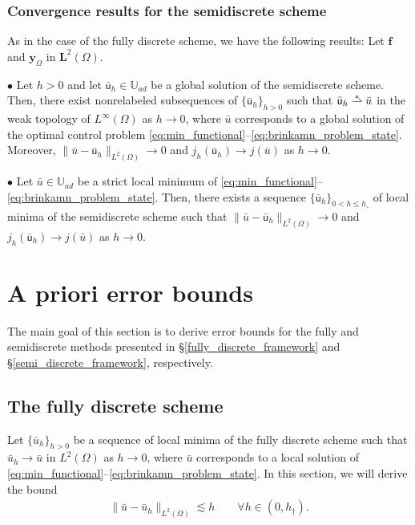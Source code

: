 \documentclass[final]{siamart0216}
\begin{document}
\subsubsection{Convergence results for the semidiscrete scheme}

As in the case of the fully discrete scheme, we have the following results: Let $\mathbf{f}$ and $\mathbf{y}_{\Omega}$ in $\mathbf{L}^2(\Omega)$.

$\bullet$ Let $h>0$ and let $\bar{\mathsf{u}}_{h}\in \mathbb{U}_{ad}$ be a global solution of the semidiscrete scheme. Then, there exist nonrelabeled subsequences of $\{\bar{\mathsf{u}}_{h}\}_{h>0}$ such that $\bar{\mathsf{u}}_{h} \mathrel{\ensurestackMath{\stackon[1pt]{\rightharpoonup}{\scriptstyle\ast}}} \bar{u}$ in the weak topology of $L^{\infty}(\Omega)$ as $h \rightarrow 0$, where $\bar{u}$ corresponds to a global solution of the optimal control problem \eqref{eq:min_functional}--\eqref{eq:brinkamn_problem_state}. Moreover, $\|\bar{u}-\bar{\mathsf{u}}_{h}\|_{L^2(\Omega)} \rightarrow 0$ and $j_h(\bar{\mathsf{u}}_{h}) \rightarrow j(\bar{u})$ as $h \rightarrow 0$.

$\bullet$ Let $\bar{u}\in\mathbb{U}_{ad}$ be a strict local minimum of \eqref{eq:min_functional}--\eqref{eq:brinkamn_problem_state}. Then, there exists a sequence $\{\bar{\mathsf{u}}_{h}\}_{0 < h \leq h_{\circ}}$ of local minima of the semidiscrete scheme such that $\|\bar{u}-\bar{\mathsf{u}}_{h}\|_{L^2(\Omega)} \rightarrow 0$ and $j_h(\bar{\mathsf{u}}_{h}) \rightarrow j(\bar{u})$ as $h \rightarrow 0$.



\section{A priori error bounds}
The main goal of this section is to derive error bounds for the fully and semidiscrete methods presented in \S \ref{fully_discrete_framework} and \S \ref{semi_discrete_framework}, respectively.

\subsection{The fully discrete scheme}
Let $\{\bar{u}_{h}\}_{h>0}$ be a sequence of local minima of the fully discrete scheme such that $\bar{u}_{h} \to \bar{u}$ in $L^2(\Omega)$ as $h\rightarrow 0$, where $\bar{u}$ corresponds to a local solution of \eqref{eq:min_functional}--\eqref{eq:brinkamn_problem_state}. In this section, we will derive the bound
\begin{align}\label{eq:error_estimate_apriori_fully}
\|\bar{u}-\bar{u}_{h}\|_{L^2(\Omega)}\lesssim h \qquad\forall h\in(0, h_{\dagger}).
\end{align}
\end{document}
